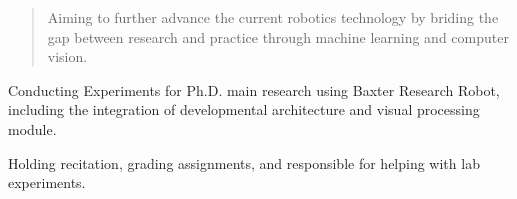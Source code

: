 \begin{quote}
Aiming to further advance the current robotics technology by briding the gap between research and practice through machine learning and computer vision.
\end{quote}

\divider


\smallskip


\divider\smallskip


\divider


\divider

\divider

\divider



Conducting Experiments for Ph.D. main research using Baxter Research Robot, including the integration of developmental architecture and visual processing module.

\divider

Holding recitation, grading assignments, and responsible for helping with lab experiments.

\divider

